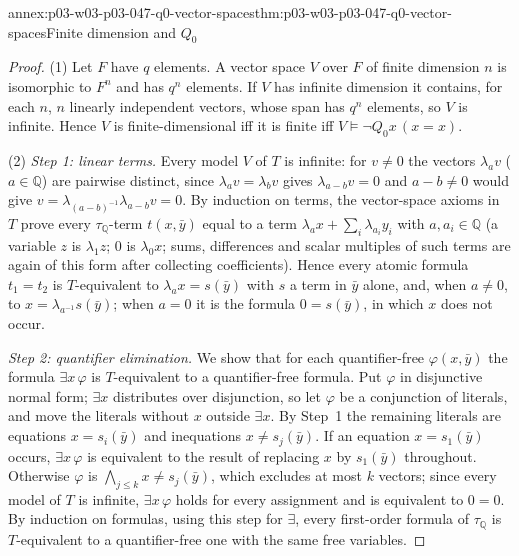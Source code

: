 \begin{annexitem}{annex:p03-w03-p03-047-q0-vector-spaces}{thm:p03-w03-p03-047-q0-vector-spaces}{Finite dimension and \(Q_0\)}
\begin{proof}
(1) Let \(F\) have \(q\) elements.  A vector space \(V\) over \(F\) of finite
dimension \(n\) is isomorphic to \(F^n\) and has \(q^n\) elements.  If \(V\)
has infinite dimension it contains, for each \(n\), \(n\) linearly
independent vectors, whose span has \(q^n\) elements, so \(V\) is infinite.
Hence \(V\) is finite-dimensional iff it is finite iff
\(V\models\neg Q_0x\,(x=x)\).

(2) \emph{Step 1: linear terms.}  Every model \(V\) of \(T\) is infinite:
for \(v\ne0\) the vectors \(\lambda_a v\) (\(a\in\mathbb Q\)) are pairwise
distinct, since \(\lambda_av=\lambda_bv\) gives \(\lambda_{a-b}v=0\) and
\(a-b\ne0\) would give \(v=\lambda_{(a-b)^{-1}}\lambda_{a-b}v=0\).  By
induction on terms, the vector-space axioms in \(T\) prove every
\(\tau_{\mathbb Q}\)-term \(t(x,\bar y)\) equal to a term
\(\lambda_a x+\sum_i\lambda_{a_i}y_i\) with \(a,a_i\in\mathbb Q\) (a variable
\(z\) is \(\lambda_1z\); \(0\) is \(\lambda_0x\); sums, differences and
scalar multiples of such terms are again of this form after collecting
coefficients).  Hence every atomic formula \(t_1=t_2\) is \(T\)-equivalent
to \(\lambda_a x=s(\bar y)\) with \(s\) a term in \(\bar y\) alone, and, when
\(a\ne0\), to \(x=\lambda_{a^{-1}}s(\bar y)\); when \(a=0\) it is the
formula \(0=s(\bar y)\), in which \(x\) does not occur.

\emph{Step 2: quantifier elimination.}  We show that for each
quantifier-free \(\varphi(x,\bar y)\) the formula \(\exists x\,\varphi\) is
\(T\)-equivalent to a quantifier-free formula.  Put \(\varphi\) in
disjunctive normal form; \(\exists x\) distributes over disjunction, so let
\(\varphi\) be a conjunction of literals, and move the literals without
\(x\) outside \(\exists x\).  By Step~1 the remaining literals are
equations \(x=s_i(\bar y)\) and inequations \(x\ne s_j(\bar y)\).  If an
equation \(x=s_1(\bar y)\) occurs, \(\exists x\,\varphi\) is equivalent to
the result of replacing \(x\) by \(s_1(\bar y)\) throughout.  Otherwise
\(\varphi\) is \(\bigwedge_{j\le k}x\ne s_j(\bar y)\), which excludes at most
\(k\) vectors; since every model of \(T\) is infinite, \(\exists x\,\varphi\)
holds for every assignment and is equivalent to \(0=0\).  By induction on
formulas, using this step for \(\exists\), every first-order formula of
\(\tau_{\mathbb Q}\) is \(T\)-equivalent to a quantifier-free one with the
same free variables.


\end{proof}
\end{annexitem}
